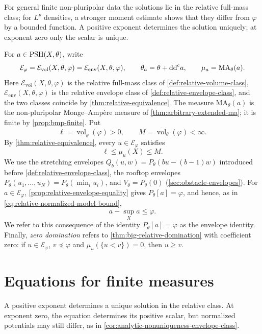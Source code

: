 For general finite non-pluripolar data the solutions lie in the relative full-mass class; for $L^p$ densities, a stronger moment estimate shows that they differ from $\varphi$ by a bounded function. A positive exponent determines the solution uniquely; at exponent zero only the scalar is unique.

For $a\in\mathrm{PSH}(X,\theta)$, write
\[
 \mathcal E_\varphi=\mathcal E_{\mathrm{vol}}(X,\theta,\varphi)
                  =\mathcal E_{\mathrm{env}}(X,\theta,\varphi),
 \qquad \theta_a=\theta+\mathrm{dd}^{\mathrm{c}} a,\qquad \mu_a=\mathrm{MA}_\theta(a).
\]
Here $\mathcal E_{\mathrm{vol}}(X,\theta,\varphi)$ is the relative full-mass class of \cref{def:relative-volume-class}, $\mathcal E_{\mathrm{env}}(X,\theta,\varphi)$ is the relative envelope class of \cref{def:relative-envelope-class}, and the two classes coincide by \cref{thm:relative-equivalence}. The measure $\mathrm{MA}_\theta(a)$ is the non-pluripolar Monge--Amp\`ere measure of \cref{thm:arbitrary-extended-ma}; it is finite by \cref{prop:bmp-finite}. Put
\[
 \ell=\underline{\operatorname{vol}}_\theta(\varphi)>0,
 \qquad M=\overline{\operatorname{vol}}_\theta(\varphi)<\infty.
\]
By \cref{thm:relative-equivalence}, every $u\in\mathcal E_\varphi$ satisfies
\begin{equation}\label{eq:big-relative-mass-interval}
 \ell\leq\mu_u(X)\leq M.
\end{equation}
We use the stretching envelopes $Q_b(u,w)=P_\theta(bu-(b-1)w)$ introduced before \cref{def:relative-envelope-class}, the rooftop envelopes $P_\theta(u_1,\ldots,u_N)=P_\theta(\min_iu_i)$, and $V_\theta=P_\theta(0)$ (\cref{sec:obstacle-envelopes}). For $a\in\mathcal E_\varphi$, \cref{prop:relative-envelope-equality} gives $P_\theta[a]=\varphi$, and hence, as in \eqref{eq:relative-normalized-model-bound},
\[
 a-\sup_Xa\leq\varphi.
\]
We refer to this consequence of the identity $P_\theta[a]=\varphi$ as the envelope identity. Finally, \emph{zero domination} refers to \cref{thm:big-relative-domination} with coefficient zero: if $u\in\mathcal E_\varphi$, $v\preceq\varphi$ and $\mu_u(\{u<v\})=0$, then $u\geq v$.

\clearpage
\section{Equations for finite measures}
\label{sec:big-general-equation-setting}

A positive exponent determines a unique solution in the relative class. At exponent zero, the equation determines its positive scalar, but normalized potentials may still differ, as in \cref{cor:analytic-nonuniqueness-envelope-class}.

